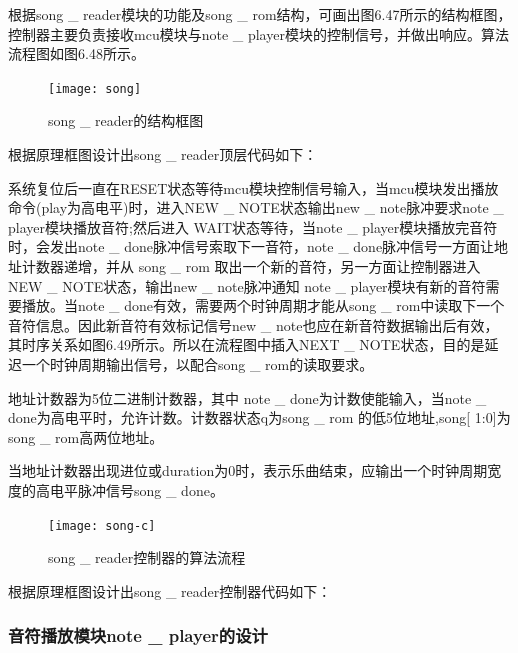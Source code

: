 \documentclass{../source/Experiment}
\begin{document}
                根据song \_ reader模块的功能及song  \_ rom结构，可画出图6.47所示的结构框图，控制器主要负责接收mcu模块与note \_ player模块的控制信号，并做出响应。算法流程图如图6.48所示。

                \begin{figure}[H]
                    \centering
                    \texttt{[image: song]}
                    \caption{song \_ reader的结构框图}
                \end{figure}

                根据原理框图设计出song \_ reader顶层代码如下：
                

                系统复位后一直在RESET状态等待mcu模块控制信号输入，当mcu模块发出播放命令(play为高电平)时，进入NEW \_ NOTE状态输出new \_ note脉冲要求note \_ player模块播放音符;然后进入 WAIT状态等待，当note \_ player模块播放完音符时，会发出note \_ done脉冲信号索取下一音符，note \_ done脉冲信号一方面让地址计数器递增，并从 song \_ rom 取出一个新的音符，另一方面让控制器进入NEW \_ NOTE状态，输出new \_ note脉冲通知 note \_ player模块有新的音符需要播放。当note \_ done有效，需要两个时钟周期才能从song \_ rom中读取下一个音符信息。因此新音符有效标记信号new \_ note也应在新音符数据输出后有效，其时序关系如图6.49所示。所以在流程图中插入NEXT \_ NOTE状态，目的是延迟一个时钟周期输出信号，以配合song \_ rom的读取要求。

                地址计数器为5位二进制计数器，其中 note \_ done为计数使能输入，当note \_ done为高电平时，允许计数。计数器状态q为song \_ rom 的低5位地址,song[ 1:0]为song  \_ rom高两位地址。
                
                当地址计数器出现进位或duration为0时，表示乐曲结束，应输出一个时钟周期宽度的高电平脉冲信号song \_ done。

                \begin{figure}[H]
                    \centering
                    \texttt{[image: song-c]}
                    \caption{song \_ reader控制器的算法流程}
                \end{figure}

                根据原理框图设计出song \_ reader控制器代码如下：
                
               
            \subsubsection{音符播放模块note \_ player的设计}
\end{document}
